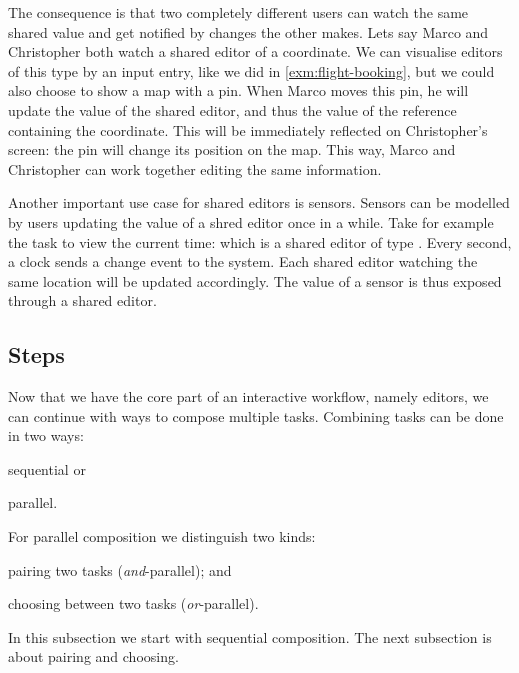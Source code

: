 The consequence is that two completely different users can watch the same shared value
and get notified by changes the other makes.
Lets say Marco and Christopher both watch a shared editor of a coordinate.
We can visualise editors of this type by an input entry,
like we did in \autoref{exm:flight-booking},
but we could also choose to show a map with a pin.
When Marco moves this pin,
he will update the value of the shared editor,
and thus the value of the reference containing the coordinate.
This will be immediately reflected on Christopher's screen:
the pin will change its position on the map.
This way, Marco and Christopher can work together editing the same information.

Another important use case for shared editors is sensors.
Sensors can be modelled by users updating the value of a shred editor once in a while.
Take for example the task to view the current time: 
which is a shared editor of type .
Every second, a clock sends a change event to the system.
Each shared editor watching the same location will be updated accordingly.
The value of a sensor is thus exposed through a shared editor.



\subsection{Steps}


Now that we have the core part of an interactive workflow,
namely editors,
we can continue with ways to compose multiple tasks.
Combining tasks can be done in two ways:
\begin{enumerate*}
  \item sequential or
  \item parallel.
\end{enumerate*}
For parallel composition we distinguish two kinds:
\begin{enumerate*}[(a)]
  \item pairing two tasks (\emph{and}-parallel); and
  \item choosing between two tasks (\emph{or}-parallel).
\end{enumerate*}
In this subsection we start with sequential composition.
The next subsection is about pairing and choosing.



